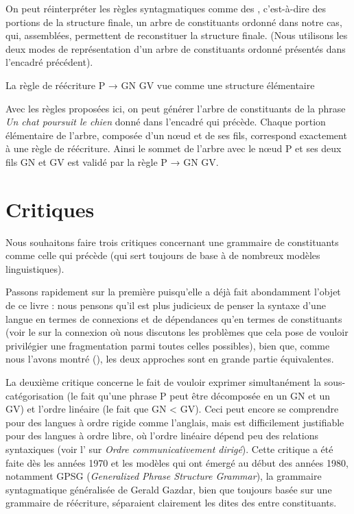 {    On peut réinterpréter les règles syntagmatiques comme des , c’est-à-dire des portions de la structure finale, un arbre de constituants ordonné dans notre cas, qui, assemblées, permettent de reconstituer la structure finale. (Nous utilisons les deux modes de représentation d’un arbre de constituants ordonné présentés dans l’encadré précédent).

    \ea
    La règle de réécriture P → GN GV vue comme une structure élémentaire
    \z

    Avec les règles proposées ici, on peut générer l’arbre de constituants de la phrase \textit{Un chat poursuit le chien} donné dans l’encadré qui précède. Chaque portion élémentaire de l’arbre, composée d’un nœud et de ses fils, correspond exactement à une règle de réécriture. Ainsi le sommet de l’arbre avec le nœud P et ses deux fils GN et GV est validé par la règle P \textrm{→} GN GV.

    \section*{Critiques}

    Nous souhaitons faire trois critiques concernant une grammaire de constituants comme celle qui précède (qui sert toujours de base à de nombreux modèles linguistiques).

    Passons rapidement sur la première puisqu’elle a déjà fait abondamment l’objet de ce livre : nous pensons qu’il est plus judicieux de penser la syntaxe d’une langue en termes de connexions et de dépendances qu’en termes de constituants (voir le  sur la connexion où nous discutons les problèmes que cela pose de vouloir privilégier une fragmentation parmi toutes celles possibles), bien que, comme nous l’avons montré (), les deux approches sont en grande partie équivalentes.

    La deuxième critique concerne le fait de vouloir exprimer simultanément la sous-catégorisation (le fait qu’une phrase P peut être décomposée en un GN et un GV) et l’ordre linéaire (le fait que GN < GV). Ceci peut encore se comprendre pour des langues à ordre rigide comme l’anglais, mais est difficilement justifiable pour des langues à ordre libre, où l’ordre linéaire dépend peu des relations syntaxiques (voir l’ sur \textit{Ordre communicativement dirigé}). Cette critique a été faite dès les années 1970 et les modèles qui ont émergé au début des années 1980, notamment GPSG (\textit{Generalized Phrase Structure Grammar}), la grammaire syntagmatique généralisée de Gerald Gazdar, bien que toujours basée sur une grammaire de réécriture, séparaient clairement les dites des  entre constituants.

}
